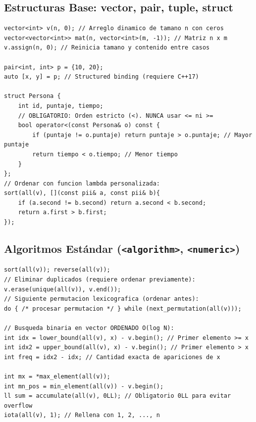 \documentclass[9pt,twocolumn,a4paper]{extarticle}
\begin{document}
\subsection{Estructuras Base: vector, pair, tuple, struct}
\begin{lstlisting}
vector<int> v(n, 0); // Arreglo dinamico de tamano n con ceros
vector<vector<int>> mat(n, vector<int>(m, -1)); // Matriz n x m
v.assign(n, 0); // Reinicia tamano y contenido entre casos

pair<int, int> p = {10, 20};
auto [x, y] = p; // Structured binding (requiere C++17)

struct Persona {
    int id, puntaje, tiempo;
    // OBLIGATORIO: Orden estricto (<). NUNCA usar <= ni >=
    bool operator<(const Persona& o) const {
        if (puntaje != o.puntaje) return puntaje > o.puntaje; // Mayor puntaje
        return tiempo < o.tiempo; // Menor tiempo
    }
};
// Ordenar con funcion lambda personalizada:
sort(all(v), [](const pii& a, const pii& b){
    if (a.second != b.second) return a.second < b.second;
    return a.first > b.first;
});
\end{lstlisting}

\subsection{Algoritmos Estándar (\texttt{<algorithm>}, \texttt{<numeric>})}
\begin{lstlisting}
sort(all(v)); reverse(all(v));
// Eliminar duplicados (requiere ordenar previamente):
v.erase(unique(all(v)), v.end());
// Siguiente permutacion lexicografica (ordenar antes):
do { /* procesar permutacion */ } while (next_permutation(all(v)));

// Busqueda binaria en vector ORDENADO O(log N):
int idx = lower_bound(all(v), x) - v.begin(); // Primer elemento >= x
int idx2 = upper_bound(all(v), x) - v.begin(); // Primer elemento > x
int freq = idx2 - idx; // Cantidad exacta de apariciones de x

int mx = *max_element(all(v));
int mn_pos = min_element(all(v)) - v.begin();
ll sum = accumulate(all(v), 0LL); // Obligatorio 0LL para evitar overflow
iota(all(v), 1); // Rellena con 1, 2, ..., n
\end{lstlisting}
\end{document}
